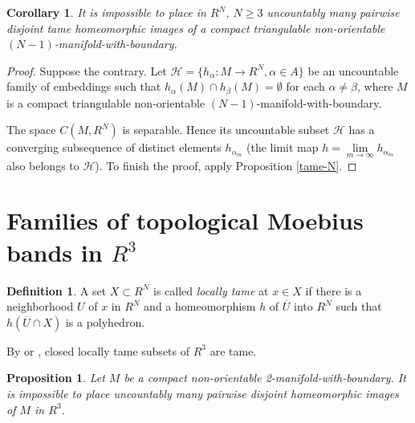 \documentclass[12pt]{article}
\newtheorem{corollary}[theorem]{Corollary}
\newtheorem{proposition}[theorem]{Proposition}
\theoremstyle{definition}
\newtheorem{definition}[theorem]{Definition}
\begin{document}
\begin{corollary}\label{tame-N-impossible}
It is impossible to place in $R^N$, $N\geqslant 3$
uncountably many
pairwise disjoint
tame 
homeomorphic
images of a compact triangulable
non-orientable ${(N-1)}$-manifold-with-boundary.
\end{corollary}

\begin{proof}
Suppose the contrary.
Let $\mathcal H = \{ h_\alpha : M\to R^N, \alpha \in A\}$
be an uncountable family of
embeddings such that
$h_\alpha (M)\cap h_\beta (M) =\emptyset $
for each $\alpha \neq \beta $, where
$M$ is a compact triangulable
non-orientable $(N-1)$-manifold-with-boundary.

The space
$C(M , R^N)$ is separable.
Hence its un\-count\-able subset $\mathcal H$
has a converging subsequence
of distinct elements
$h_{\alpha _m}$ (the limit map $h=\lim\limits_{m\to\infty }  h_{\alpha _m}$
also  belongs to $\mathcal H$).
To finish the proof, apply Proposition \ref{tame-N}.
\end{proof}


\section{Families of topological Moebius bands in $R^3$}

\begin{definition}
A set $X\subset R^N$  is called
{\it locally tame} at $x\in X$
if there is a neighborhood $U$ of $x$
in $R^N$ and a homeomorphism
$h$ of $\overline U$ into $R^N$ such that
$h(\overline{U} \cap X)$
is a polyhedron.
\end{definition}

By 
\cite{Bing-loc-tame}
or \cite{Moise-loc-tame},
closed locally tame subsets of $R^3$
are tame.


\begin{proposition}\label{M-3}
Let $M$ be a compact
non-orientable
2-manifold-with-boundary.
It is impossible to place
uncountably many 
pairwise disjoint
homeomorphic images of $M$
in
$R^3$.
\end{proposition}
\end{document}
